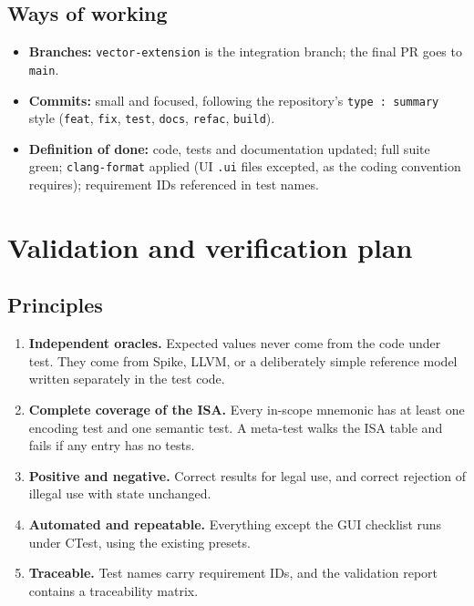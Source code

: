 \documentclass[11pt]{article}
\begin{document}
\subsection{Ways of working}
\begin{itemize}
\item \textbf{Branches:} \texttt{vector-extension} is the integration branch; the final PR goes to \texttt{main}.
\item \textbf{Commits:} small and focused, following the repository's \texttt{type : summary} style
      (\texttt{feat}, \texttt{fix}, \texttt{test}, \texttt{docs}, \texttt{refac}, \texttt{build}).
\item \textbf{Definition of done:} code, tests and documentation updated; full suite green;
      \texttt{clang-format} applied (UI \texttt{.ui} files excepted, as the coding convention requires);
      requirement IDs referenced in test names.
\end{itemize}

\section{Validation and verification plan}\label{sec:validation}

\subsection{Principles}
\begin{enumerate}
\item \textbf{Independent oracles.} Expected values never come from the code under test. They come
      from Spike, LLVM, or a deliberately simple reference model written separately in the test code.
\item \textbf{Complete coverage of the ISA.} Every in-scope mnemonic has at least one encoding test
      and one semantic test. A meta-test walks the ISA table and fails if any entry has no tests.
\item \textbf{Positive and negative.} Correct results for legal use, and correct rejection of
      illegal use with state unchanged.
\item \textbf{Automated and repeatable.} Everything except the GUI checklist runs under CTest, using
      the existing presets.
\item \textbf{Traceable.} Test names carry requirement IDs, and the validation report contains a
      traceability matrix.
\end{enumerate}
\end{document}
